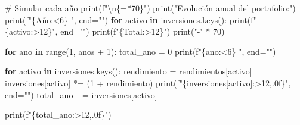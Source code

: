 \documentclass[
  doc,
  floatsintext,
  longtable,
  a4paper,
  nolmodern,
  notxfonts,
  notimes,
  12pt,
  colorlinks=true,linkcolor=blue,citecolor=blue,urlcolor=blue]{apa7}
\newenvironment{Shaded}{\begin{snugshade}}{\end{snugshade}}
\newcommand{\BuiltInTok}[1]{\textcolor[rgb]{0.00,0.23,0.31}{#1}}
\newcommand{\CharTok}[1]{\textcolor[rgb]{0.13,0.47,0.30}{#1}}
\newcommand{\CommentTok}[1]{\textcolor[rgb]{0.37,0.37,0.37}{#1}}
\newcommand{\ControlFlowTok}[1]{\textcolor[rgb]{0.00,0.23,0.31}{\textbf{#1}}}
\newcommand{\DecValTok}[1]{\textcolor[rgb]{0.68,0.00,0.00}{#1}}
\newcommand{\KeywordTok}[1]{\textcolor[rgb]{0.00,0.23,0.31}{\textbf{#1}}}
\newcommand{\NormalTok}[1]{\textcolor[rgb]{0.00,0.23,0.31}{#1}}
\newcommand{\OperatorTok}[1]{\textcolor[rgb]{0.37,0.37,0.37}{#1}}
\newcommand{\SpecialCharTok}[1]{\textcolor[rgb]{0.37,0.37,0.37}{#1}}
\newcommand{\SpecialStringTok}[1]{\textcolor[rgb]{0.13,0.47,0.30}{#1}}
\newcommand{\StringTok}[1]{\textcolor[rgb]{0.13,0.47,0.30}{#1}}
\begin{document}
\begin{Shaded}
\begin{Highlighting}[]
    \CommentTok{\# Simular cada año}
    \BuiltInTok{print}\NormalTok{(}\SpecialStringTok{f"}\CharTok{\textbackslash{}n}\SpecialCharTok{\{}\StringTok{\textquotesingle{}=\textquotesingle{}}\OperatorTok{*}\DecValTok{70}\SpecialCharTok{\}}\SpecialStringTok{"}\NormalTok{)}
    \BuiltInTok{print}\NormalTok{(}\StringTok{"Evolución anual del portafolio:"}\NormalTok{)}
    \BuiltInTok{print}\NormalTok{(}\SpecialStringTok{f"}\SpecialCharTok{\{}\StringTok{\textquotesingle{}Año\textquotesingle{}}\SpecialCharTok{:\textless{}6\}}\SpecialStringTok{ "}\NormalTok{, end}\OperatorTok{=}\StringTok{""}\NormalTok{)}
    \ControlFlowTok{for}\NormalTok{ activo }\KeywordTok{in}\NormalTok{ inversiones.keys():}
        \BuiltInTok{print}\NormalTok{(}\SpecialStringTok{f"}\SpecialCharTok{\{}\NormalTok{activo}\SpecialCharTok{:\textgreater{}12\}}\SpecialStringTok{"}\NormalTok{, end}\OperatorTok{=}\StringTok{""}\NormalTok{)}
    \BuiltInTok{print}\NormalTok{(}\SpecialStringTok{f"}\SpecialCharTok{\{}\StringTok{\textquotesingle{}Total\textquotesingle{}}\SpecialCharTok{:\textgreater{}12\}}\SpecialStringTok{"}\NormalTok{)}
    \BuiltInTok{print}\NormalTok{(}\StringTok{"{-}"} \OperatorTok{*} \DecValTok{70}\NormalTok{)}
    
    \ControlFlowTok{for}\NormalTok{ ano }\KeywordTok{in} \BuiltInTok{range}\NormalTok{(}\DecValTok{1}\NormalTok{, anos }\OperatorTok{+} \DecValTok{1}\NormalTok{):}
\NormalTok{        total\_ano }\OperatorTok{=} \DecValTok{0}
        \BuiltInTok{print}\NormalTok{(}\SpecialStringTok{f"}\SpecialCharTok{\{}\NormalTok{ano}\SpecialCharTok{:\textless{}6\}}\SpecialStringTok{ "}\NormalTok{, end}\OperatorTok{=}\StringTok{""}\NormalTok{)}
        
        \ControlFlowTok{for}\NormalTok{ activo }\KeywordTok{in}\NormalTok{ inversiones.keys():}
\NormalTok{            rendimiento }\OperatorTok{=}\NormalTok{ rendimientos[activo]}
\NormalTok{            inversiones[activo] }\OperatorTok{*=}\NormalTok{ (}\DecValTok{1} \OperatorTok{+}\NormalTok{ rendimiento)}
            \BuiltInTok{print}\NormalTok{(}\SpecialStringTok{f"}\SpecialCharTok{\{}\NormalTok{inversiones[activo]}\SpecialCharTok{:\textgreater{}12,.0f\}}\SpecialStringTok{"}\NormalTok{, end}\OperatorTok{=}\StringTok{""}\NormalTok{)}
\NormalTok{            total\_ano }\OperatorTok{+=}\NormalTok{ inversiones[activo]}
        
        \BuiltInTok{print}\NormalTok{(}\SpecialStringTok{f"}\SpecialCharTok{\{}\NormalTok{total\_ano}\SpecialCharTok{:\textgreater{}12,.0f\}}\SpecialStringTok{"}\NormalTok{)}
    

\end{Highlighting}
\end{Shaded}
\end{document}
